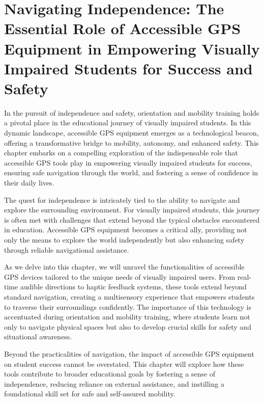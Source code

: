 \documentclass[14pt,letterpaper,twoside]{extreport}
\begin{document}
	\pagebreak \hypertarget{accessible-gps-mapping}{}\chapter[Navigating Independence: The Essential Role of Accessible GPS Equipment in Empowering Visually Impaired Students for Success and Safety]{Navigating Independence: The Essential Role of Accessible GPS Equipment in Empowering Visually Impaired Students for Success and Safety}\label{accessible-gps-mapping}
In the pursuit of independence and safety, orientation and mobility training holds a pivotal place in the educational journey of visually impaired students. In this dynamic landscape, accessible GPS equipment emerges as a technological beacon, offering a transformative bridge to mobility, autonomy, and enhanced safety. This chapter embarks on a compelling exploration of the indispensable role that accessible GPS tools play in empowering visually impaired students for success, ensuring safe navigation through the world, and fostering a sense of confidence in their daily lives.

The quest for independence is intricately tied to the ability to navigate and explore the surrounding environment. For visually impaired students, this journey is often met with challenges that extend beyond the typical obstacles encountered in education. Accessible GPS equipment becomes a critical ally, providing not only the means to explore the world independently but also enhancing safety through reliable navigational assistance.

As we delve into this chapter, we will unravel the functionalities of accessible GPS devices tailored to the unique needs of visually impaired users. From real-time audible directions to haptic feedback systems, these tools extend beyond standard navigation, creating a multisensory experience that empowers students to traverse their surroundings confidently. The importance of this technology is accentuated during orientation and mobility training, where students learn not only to navigate physical spaces but also to develop crucial skills for safety and situational awareness.

Beyond the practicalities of navigation, the impact of accessible GPS equipment on student success cannot be overstated. This chapter will explore how these tools contribute to broader educational goals by fostering a sense of independence, reducing reliance on external assistance, and instilling a foundational skill set for safe and self-assured mobility.
\end{document}
